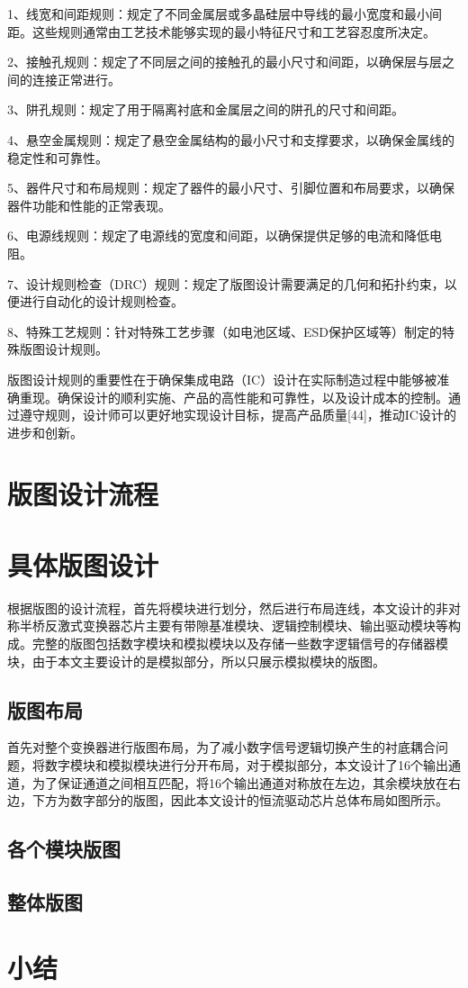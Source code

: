 1、线宽和间距规则：规定了不同金属层或多晶硅层中导线的最小宽度和最小间距。这些规则通常由工艺技术能够实现的最小特征尺寸和工艺容忍度所决定。

2、接触孔规则：规定了不同层之间的接触孔的最小尺寸和间距，以确保层与层之间的连接正常进行。

3、阱孔规则：规定了用于隔离衬底和金属层之间的阱孔的尺寸和间距。

4、悬空金属规则：规定了悬空金属结构的最小尺寸和支撑要求，以确保金属线的稳定性和可靠性。

5、器件尺寸和布局规则：规定了器件的最小尺寸、引脚位置和布局要求，以确保器件功能和性能的正常表现。

6、电源线规则：规定了电源线的宽度和间距，以确保提供足够的电流和降低电阻。

7、设计规则检查（DRC）规则：规定了版图设计需要满足的几何和拓扑约束，以便进行自动化的设计规则检查。

8、特殊工艺规则：针对特殊工艺步骤（如电池区域、ESD保护区域等）制定的特殊版图设计规则。

版图设计规则的重要性在于确保集成电路（IC）设计在实际制造过程中能够被准确重现。确保设计的顺利实施、产品的高性能和可靠性，以及设计成本的控制。通过遵守规则，设计师可以更好地实现设计目标，提高产品质量[44]，推动IC设计的进步和创新。

\section{版图设计流程}

\section{具体版图设计}

根据版图的设计流程，首先将模块进行划分，然后进行布局连线，本文设计的非对称半桥反激式变换器芯片主要有带隙基准模块、逻辑控制模块、输出驱动模块等构成。完整的版图包括数字模块和模拟模块以及存储一些数字逻辑信号的存储器模块，由于本文主要设计的是模拟部分，所以只展示模拟模块的版图。

\subsection{版图布局}

首先对整个变换器进行版图布局，为了减小数字信号逻辑切换产生的衬底耦合问题，将数字模块和模拟模块进行分开布局，对于模拟部分，本文设计了16个输出通道，为了保证通道之间相互匹配，将16个输出通道对称放在左边，其余模块放在右边，下方为数字部分的版图，因此本文设计的恒流驱动芯片总体布局如图所示。

\subsection{各个模块版图}

\subsection{整体版图}


\section{小结}




